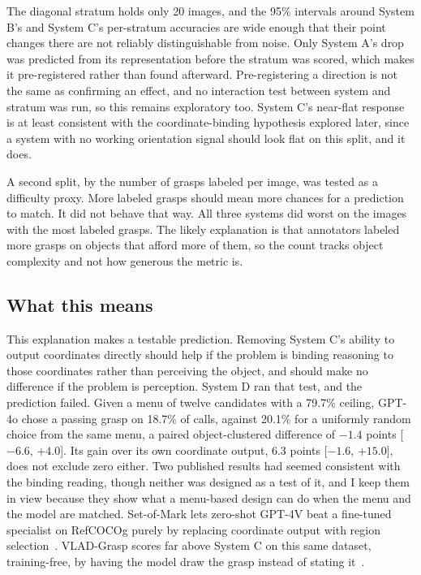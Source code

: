 \documentclass[12pt,letterpaper]{article}
\begin{document}
The diagonal stratum holds only 20 images, and the 95\% intervals
around System B's and System C's per-stratum accuracies are wide enough
that their point changes there are not reliably distinguishable from
noise. Only System A's drop was predicted from its representation
before the stratum was scored, which makes it pre-registered rather
than found afterward. Pre-registering a direction is not the same as
confirming an effect, and no interaction test between system and
stratum was run, so this remains exploratory too. System C's near-flat
response is at least consistent with the coordinate-binding hypothesis
explored later, since a system with no working orientation signal
should look flat on this split, and it does.

A second split, by the number of grasps labeled per image, was tested
as a difficulty proxy. More labeled grasps should mean more chances for
a prediction to match. It did not behave that way. All three systems
did worst on the images with the most labeled grasps. The likely
explanation is that annotators labeled more grasps on objects that
afford more of them, so the count tracks object complexity and not
how generous the metric is.

\subsection{What this means}

This explanation makes a testable prediction. Removing System C's
ability to output coordinates directly should help if the problem is
binding reasoning to those coordinates rather than perceiving the
object, and should make no difference if the problem is perception.
System D ran that test, and the prediction failed. Given a menu of
twelve candidates with a 79.7\% ceiling, GPT-4o chose a passing grasp
on 18.7\% of calls, against 20.1\% for a uniformly random choice from
the same menu, a paired object-clustered difference of $-1.4$ points
[$-6.6$, $+4.0$]. Its gain over its own coordinate output, 6.3 points
[$-1.6$, $+15.0$], does not exclude zero either. Two published results
had seemed consistent with the binding reading, though neither was
designed as a test of it, and I keep them in view because
they show what a menu-based design can do when the menu and the model
are matched. Set-of-Mark lets zero-shot GPT-4V beat a
fine-tuned specialist on RefCOCOg purely by replacing coordinate output
with region selection~\cite{yang2024}. VLAD-Grasp scores far above System
C on this same dataset, training-free, by having the model draw the
grasp instead of stating it~\cite{kulshrestha2025}.
\end{document}
